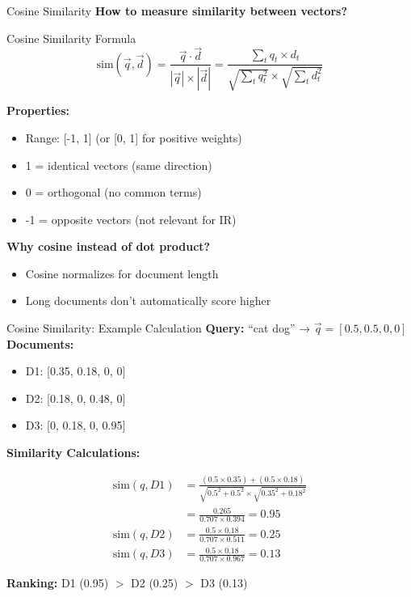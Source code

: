 \documentclass[aspectratio=169]{beamer}
\newif\ifanimated
\newcommand{\cpause}{\ifanimated\pause\fi}
\begin{document}
\begin{frame}[shrink=10]{Cosine Similarity}
\textbf{How to measure similarity between vectors?}

\vspace{1em}

\begin{block}{Cosine Similarity Formula}
$$\text{sim}(\vec{q}, \vec{d}) = \frac{\vec{q} \cdot \vec{d}}{|\vec{q}| \times |\vec{d}|} = \frac{\sum_{t} q_t \times d_t}{\sqrt{\sum_{t} q_t^2} \times \sqrt{\sum_{t} d_t^2}}$$
\end{block}
\cpause
\vspace{1em}

\textbf{Properties:}
\begin{itemize}
    \item Range: [-1, 1] (or [0, 1] for positive weights)
    \item 1 = identical vectors (same direction)
    \item 0 = orthogonal (no common terms)
    \item -1 = opposite vectors (not relevant for IR)
\end{itemize}
\cpause
\vspace{1em}

\textbf{Why cosine instead of dot product?}
\begin{itemize}
    \item Cosine normalizes for document length
    \item Long documents don't automatically score higher
\end{itemize}
\end{frame}

\begin{frame}[shrink=10]{Cosine Similarity: Example Calculation}
\textbf{Query:} ``cat dog'' → $\vec{q} = [0.5, 0.5, 0, 0]$ \\
\textbf{Documents:}
\begin{itemize}
    \item D1: [0.35, 0.18, 0, 0]
    \item D2: [0.18, 0, 0.48, 0]
    \item D3: [0, 0.18, 0, 0.95]
\end{itemize}
\cpause
\vspace{1em}

\textbf{Similarity Calculations:}

\begin{align*}
\text{sim}(q, D1) &= \frac{(0.5 \times 0.35) + (0.5 \times 0.18)}{\sqrt{0.5^2 + 0.5^2} \times \sqrt{0.35^2 + 0.18^2}} \\
&= \frac{0.265}{0.707 \times 0.394} = 0.95 \\
\text{sim}(q, D2) &= \frac{0.5 \times 0.18}{0.707 \times 0.511} = 0.25 \\
\text{sim}(q, D3) &= \frac{0.5 \times 0.18}{0.707 \times 0.967} = 0.13
\end{align*}

\vspace{1em}

\textbf{Ranking:} D1 (0.95) $>$ D2 (0.25) $>$ D3 (0.13)
\end{frame}
\end{document}
